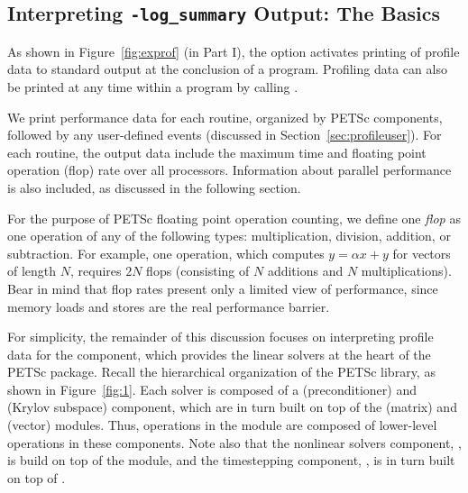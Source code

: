 \subsection{Interpreting {\tt -log\_summary} Output: The Basics}

As shown in Figure~\ref{fig:exprof} (in Part I), the option   activates printing of profile
data to standard output at the conclusion of a program.  Profiling
data can also be printed at any time within a program by calling .

We print performance data for each routine, organized by PETSc
components, followed by any user-defined events (discussed in
Section~\ref{sec:profileuser}).  For each routine, the output data
include the maximum time and floating point operation (flop) rate over
all processors.  Information about parallel performance is also
included, as discussed in the following section.

For the purpose of PETSc floating point operation counting, we define
one {\em flop} as one operation of any of the following types:
multiplication, division, addition, or subtraction.  For example, one
 operation, which computes $y = \alpha x + y$ for
vectors of length $N$, requires $2N$ flops (consisting of $N$
additions and $N$ multiplications).  Bear in mind that flop rates
present only a limited view of performance, since memory loads and stores are
the real performance barrier.

For simplicity, the remainder of this discussion focuses on
interpreting profile data for the  component, 
which provides the linear solvers at the heart of the
PETSc package.  Recall the hierarchical organization of the PETSc
library, as shown in Figure~\ref{fig:1}.  Each  solver 
is composed of a  (preconditioner) and  (Krylov
subspace) component, which are in turn built on top of the  
(matrix) and  (vector) modules.  Thus, operations in the
 module are composed of lower-level operations in these
components.  Note also that the nonlinear solvers component, , 
is build on top of the  module, and the timestepping
component, , is in turn built on top of .

